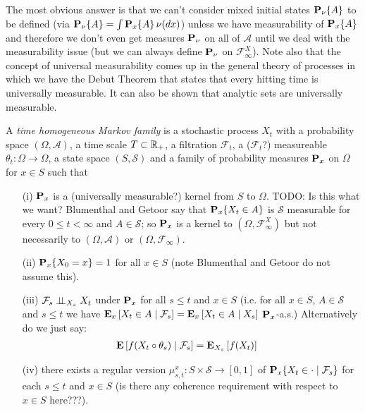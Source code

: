 The most obvious answer is that we can't consider mixed initial states $\sprobability{A}{\nu}$ to be defined (via $\sprobability{A}{\nu} = \int \sprobability{A}{x}  \, \nu(dx)$) unless we have measurability of $\sprobability{A}{x}$ and therefore we don't even get measures $\probabilityop_{\nu}$ on all of $\mathcal{A}$ until we deal with the measurability issue (but we can always define $\probabilityop_{\nu}$ on $\mathcal{F}^X_\infty$).  Note also that the 
concept of universal measurability comes up in the general theory of processes in which
we have the Debut Theorem that states that every hitting time is universally measurable.  It can also be shown that
analytic sets are universally measurable.  

\begin{defn}\label{MarkovFamilyDefn}
A \emph{time homogeneous Markov family} is a stochastic process $X_t$ with a
probability space $(\Omega, \mathcal{A})$, a time scale $T
\subset \reals_+$, a filtration $\mathcal{F}_t$, a ($\mathcal{F}_t$?) measureable $\theta_t : \Omega \to \Omega$, a state space $(S, \mathcal{S})$ and a family of
probability measures $\probabilityop_x$ on $\Omega$ for $x \in S$ such that 
\begin{itemize}
\item[(i)]$\probabilityop_x$ is a (universally measurable?) kernel
  from $S$ to $\Omega$.  TODO: Is this what we want?  Blumenthal and Getoor say that $\sprobability{X_t \in A}{x}$ is $\mathcal{S}$ measurable for every
$0 \leq t < \infty$ and $A \in \mathcal{S}$; so $\probabilityop_x$ is a kernel to $(\Omega, \mathcal{F}^X_\infty)$ but not necessarily to $(\Omega, \mathcal{A})$ or 
$(\Omega, \mathcal{F}_\infty)$.
\item[(ii)]$\sprobability{X_0 = x}{x} = 1$ for all $x \in S$ (note Blumenthal and Getoor do not assume this).
\item[(iii)]$\cindependent{\mathcal{F}_s}{X_t}{X_s}$ under
  $\probabilityop_x$ for all $s \leq
  t$ and $x \in S$ (i.e. for all $x \in S$, $A \in \mathcal{S}$ and $s \leq t$ we have
  $\csexpectationlong{\mathcal{F}_s}{X_t \in A}{x} =
  \csexpectationlong{X_s}{X_t \in A}{x}$ $\probabilityop_x$-a.s.)  Alternatively do we just say:
\begin{align*}
\cexpectationlong{\mathcal{F}_s}{f (X_t \circ \theta_s)} &= \sexpectation{f(X_t)}{X_s}
\end{align*}
\item[(iv)]there exists a regular version $\mu^x_{s,t} :
  S \times \mathcal{S} \to [0,1]$ of $\csprobability{\mathcal{F}_s}{X_t
    \in \cdot}{x}$ for each $s \leq t$ and $x \in S$ (is there any coherence
  requirement with respect to $x \in S$ here???).
\end{itemize}
\end{defn}

